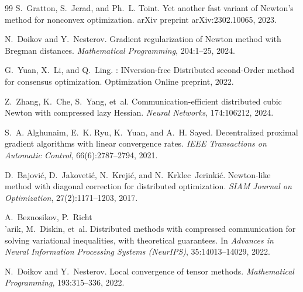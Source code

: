\documentclass[review,onefignum,onetabnum]{siamart171218}
\begin{document}
\begin{thebibliography}{99}
		S.~Gratton, S.~Jerad, and Ph.~L. Toint.
		\newblock Yet another fast variant of {N}ewton's method for nonconvex optimization.
		\newblock arXiv preprint arXiv:2302.10065, 2023.
		
		N.~Doikov and Y.~Nesterov.
		\newblock Gradient regularization of {N}ewton method with {B}regman distances.
		\newblock \textit{Mathematical Programming}, 204:1--25, 2024.
		
		G.~Yuan, X.~Li, and Q.~Ling.
		: {IN}version-free {D}istributed second-{O}rder method for consensus optimization.
		\newblock Optimization Online preprint, 2022.
		
		Z.~Zhang, K.~Che, S.~Yang, et~al.
		\newblock Communication-efficient distributed cubic {N}ewton with compressed lazy {H}essian.
		\newblock \textit{Neural Networks}, 174:106212, 2024.
		
		S.~A. Alghunaim, E.~K. Ryu, K.~Yuan, and A.~H. Sayed.
		\newblock Decentralized proximal gradient algorithms with linear convergence rates.
		\newblock \textit{IEEE Transactions on Automatic Control}, 66(6):2787--2794, 2021.
		
		D.~Bajovi{\'c}, D.~Jakoveti{\'c}, N.~Kre\-ji{\'c}, and N.~Krklec~Jerinki{\'c}.
		\newblock Newton-like method with diagonal correction for distributed optimization.
		\newblock \textit{SIAM Journal on Optimization}, 27(2):1171--1203, 2017.
		
		A.~Beznosikov, P.~Richt{\\'a}rik, M.~Diskin, et~al.
		\newblock Distributed methods with compressed communication for solving variational inequalities, with theoretical guarantees.
		\newblock In \textit{Advances in Neural Information Processing Systems (NeurIPS)}, 35:14013--14029, 2022.
		
		N.~Doikov and Y.~Nesterov.
		\newblock Local convergence of tensor methods.
		\newblock \textit{Mathematical Programming}, 193:315--336, 2022.
		

\end{thebibliography}
\end{document}
